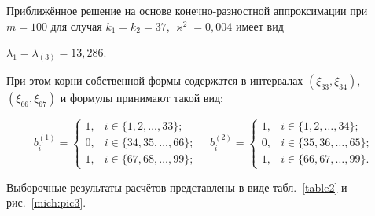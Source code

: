 



Приближённое решение на основе конечно-разностной аппроксимации при $m=100$ для случая $k_1=k_2=37$, $\varkappa^2=0,004$ имеет вид 

$\lambda_{1}=\lambda_{(3)}=13,286$.

При этом корни собственной формы содержатся в интервалах $(\xi_{33}, \xi_{34})$, \linebreak $(\xi_{66}, \xi_{67})$  и формулы принимают такой вид:

\begin{equation*}

b_i^{(1)}=

\begin{cases}

1, & i\in\{1, 2, \dots, 33\};\\

0, & i\in\{34, 35,\dots, 66\};\\

1, & i\in\{67, 68,\dots, 99\};

\end{cases}\quad  

b_i^{(2)}=

\begin{cases}

1, & i\in\{1, 2,\dots, 34\};\\

0, & i\in\{35, 36,\dots, 65\};\\

1, & i\in\{66, 67,\dots, 99\}.

\end{cases}		

\end{equation*}



Выборочные результаты расчётов представлены в виде табл.~\ref{table2} и рис.~\ref{mich:pic3}.



